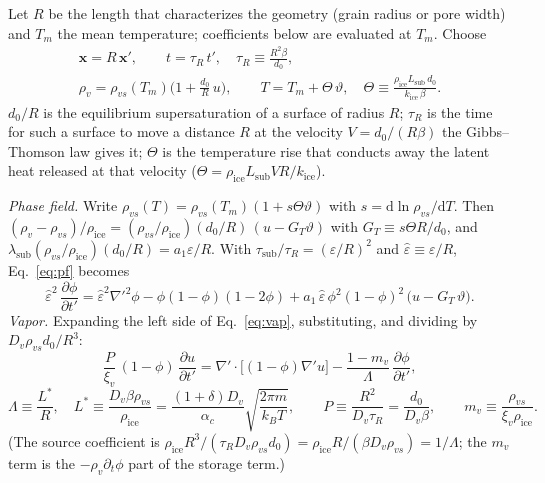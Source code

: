 \documentclass[11pt]{article}
\newcommand{\ice}{\mathrm{ice}}
\newcommand{\rvs}{\rho_{vs}}
\newcommand{\eh}{\hat\varepsilon}
\newcommand{\pd}[2]{\frac{\partial #1}{\partial #2}}
\begin{document}
Let $R$ be the length that characterizes the geometry (grain radius or pore
width) and $T_m$ the mean temperature; coefficients below are evaluated at
$T_m$. Choose
\begin{equation}
\begin{gathered}
\mathbf x = R\,\mathbf x',\qquad
t = \tau_{R}\,t',\quad \tau_{R} \equiv \frac{R^{2}\beta}{d_0},\\
\rho_v = \rvs(T_m)\Big(1 + \frac{d_0}{R}\,u\Big),\qquad
T = T_m + \Theta\,\vartheta,\quad \Theta \equiv \frac{\rho_\ice L_{\mathrm{sub}}\,d_0}{k_\ice\,\beta} .
\end{gathered}
\label{eq:scales}
\end{equation}
$d_0/R$ is the equilibrium supersaturation of a surface of radius $R$;
$\tau_{R}$ is the time for such a surface to move a distance $R$ at the velocity
$V = d_0/(R\beta)$ the Gibbs--Thomson law gives it; $\Theta$ is the
temperature rise that conducts away the latent heat released at that
velocity ($\Theta = \rho_\ice L_{\mathrm{sub}} V R/k_\ice$).

\emph{Phase field.} Write $\rvs(T) = \rvs(T_m)(1 + s\Theta\vartheta)$ with $s
= \mathrm d\ln\rvs/\mathrm dT$. Then $(\rho_v - \rvs)/\rho_\ice =
(\rvs/\rho_\ice)(d_0/R)\,(u - G_T\vartheta)$ with $G_T \equiv s\Theta R/d_0$,
and $\lambda_{\mathrm{sub}}(\rvs/\rho_\ice)(d_0/R) = a_1\varepsilon/R$. With
$\tau_{\mathrm{sub}}/\tau_{R} = (\varepsilon/R)^{2}$ and $\eh \equiv
\varepsilon/R$, Eq.~\eqref{eq:pf} becomes
\begin{equation}
\eh^{2}\,\pd{\phi}{t'} = \eh^{2}\nabla'^{2}\phi - \phi(1-\phi)(1-2\phi)
 + a_1\,\eh\,\phi^{2}(1-\phi)^{2}\,\big(u - G_T\,\vartheta\big) .
\label{eq:nd-pf}
\end{equation}
\emph{Vapor.} Expanding the left side of Eq.~\eqref{eq:vap}, substituting,
and dividing by $D_v\rvs d_0/R^{3}$:
\begin{equation}
\frac{P}{\xi_v}\,(1-\phi)\,\pd{u}{t'} = \nabla'\cdot\big[(1-\phi)\nabla' u\big] - \frac{1 - m_v}{\Lambda}\,\pd{\phi}{t'} ,
\label{eq:nd-vap}
\end{equation}
\[
\Lambda \equiv \frac{L^{*}}{R},\quad L^{*} \equiv \frac{D_v\beta\rvs}{\rho_\ice} = \frac{(1+\delta)D_v}{\alpha_c}\sqrt{\frac{2\pi m}{k_BT}},\qquad
P \equiv \frac{R^{2}}{D_v\tau_{R}} = \frac{d_0}{D_v\beta},\qquad
m_v \equiv \frac{\rvs}{\xi_v\rho_\ice} .
\]
(The source coefficient is $\rho_\ice R^{3}/(\tau_{R} D_v\rvs d_0) = \rho_\ice
R/(\beta D_v\rvs) = 1/\Lambda$; the $m_v$ term is the $-\rho_v\partial_t\phi$
part of the storage term.)
\end{document}
